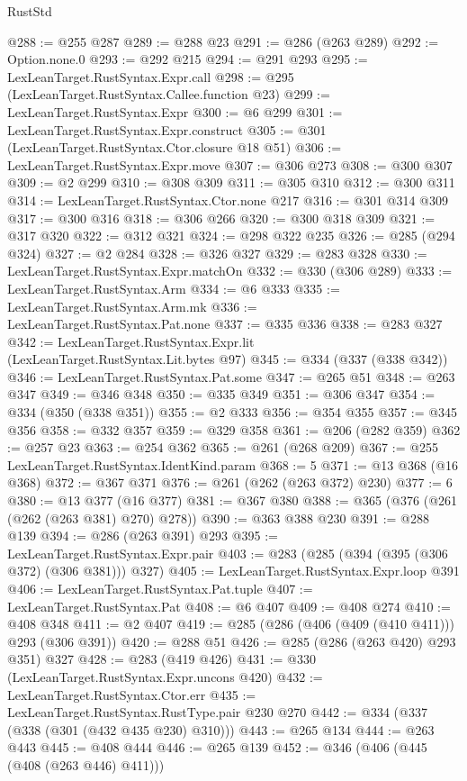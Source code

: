 \begin{lexlean}{RustStd}
\begin{coremodule}
@288 := @255 @287
@289 := @288 @23
@291 := @286 (@263 @289)
@292 := Option.none.{0}
@293 := @292 @215
@294 := @291 @293
@295 := LexLeanTarget.RustSyntax.Expr.call
@298 := @295 (LexLeanTarget.RustSyntax.Callee.function @23)
@299 := LexLeanTarget.RustSyntax.Expr
@300 := @6 @299
@301 := LexLeanTarget.RustSyntax.Expr.construct
@305 := @301 (LexLeanTarget.RustSyntax.Ctor.closure @18 @51)
@306 := LexLeanTarget.RustSyntax.Expr.move
@307 := @306 @273
@308 := @300 @307
@309 := @2 @299
@310 := @308 @309
@311 := @305 @310
@312 := @300 @311
@314 := LexLeanTarget.RustSyntax.Ctor.none @217
@316 := @301 @314 @309
@317 := @300 @316
@318 := @306 @266
@320 := @300 @318 @309
@321 := @317 @320
@322 := @312 @321
@324 := @298 @322 @235
@326 := @285 (@294 @324)
@327 := @2 @284
@328 := @326 @327
@329 := @283 @328
@330 := LexLeanTarget.RustSyntax.Expr.matchOn
@332 := @330 (@306 @289)
@333 := LexLeanTarget.RustSyntax.Arm
@334 := @6 @333
@335 := LexLeanTarget.RustSyntax.Arm.mk
@336 := LexLeanTarget.RustSyntax.Pat.none
@337 := @335 @336
@338 := @283 @327
@342 := LexLeanTarget.RustSyntax.Expr.lit (LexLeanTarget.RustSyntax.Lit.bytes @97)
@345 := @334 (@337 (@338 @342))
@346 := LexLeanTarget.RustSyntax.Pat.some
@347 := @265 @51
@348 := @263 @347
@349 := @346 @348
@350 := @335 @349
@351 := @306 @347
@354 := @334 (@350 (@338 @351))
@355 := @2 @333
@356 := @354 @355
@357 := @345 @356
@358 := @332 @357
@359 := @329 @358
@361 := @206 (@282 @359)
@362 := @257 @23
@363 := @254 @362
@365 := @261 (@268 @209)
@367 := @255 LexLeanTarget.RustSyntax.IdentKind.param
@368 := 5
@371 := @13 @368 (@16 @368)
@372 := @367 @371
@376 := @261 (@262 (@263 @372) @230)
@377 := 6
@380 := @13 @377 (@16 @377)
@381 := @367 @380
@388 := @365 (@376 (@261 (@262 (@263 @381) @270) @278))
@390 := @363 @388 @230
@391 := @288 @139
@394 := @286 (@263 @391) @293
@395 := LexLeanTarget.RustSyntax.Expr.pair
@403 := @283 (@285 (@394 (@395 (@306 @372) (@306 @381))) @327)
@405 := LexLeanTarget.RustSyntax.Expr.loop @391
@406 := LexLeanTarget.RustSyntax.Pat.tuple
@407 := LexLeanTarget.RustSyntax.Pat
@408 := @6 @407
@409 := @408 @274
@410 := @408 @348
@411 := @2 @407
@419 := @285 (@286 (@406 (@409 (@410 @411))) @293 (@306 @391))
@420 := @288 @51
@426 := @285 (@286 (@263 @420) @293 @351) @327
@428 := @283 (@419 @426)
@431 := @330 (LexLeanTarget.RustSyntax.Expr.uncons @420)
@432 := LexLeanTarget.RustSyntax.Ctor.err
@435 := LexLeanTarget.RustSyntax.RustType.pair @230 @270
@442 := @334 (@337 (@338 (@301 (@432 @435 @230) @310)))
@443 := @265 @134
@444 := @263 @443
@445 := @408 @444
@446 := @265 @139
@452 := @346 (@406 (@445 (@408 (@263 @446) @411)))

\end{coremodule}
\end{lexlean}
